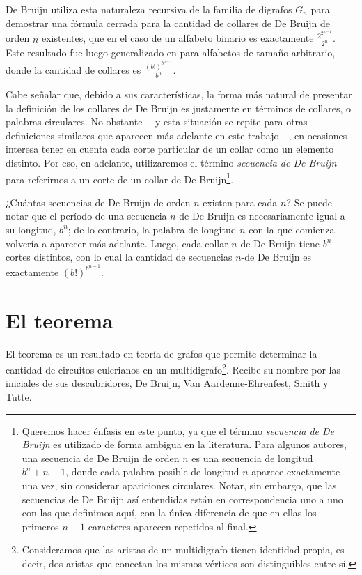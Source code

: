 De Bruijn utiliza esta naturaleza recursiva de la familia de digrafos $G_n$
para demostrar una fórmula cerrada para la cantidad de collares de De Bruijn
de orden $n$ existentes, que en el caso de un alfabeto binario es exactamente
$\frac{2^{2^{n-1}}}{2^n}$. Este resultado fue luego generalizado en
\cite{van-aardenne-ehrenfest-circuits-and-trees} para alfabetos de tamaño arbitrario,
donde la cantidad de collares es $\frac{(b!)^{b^{n-1}}}{b^n}$.

Cabe señalar que, debido a sus características, la forma más natural de
presentar la definición de los collares de De Bruijn es justamente en términos
de collares, o palabras circulares. No obstante ---y esta situación se repite
para otras definiciones similares que aparecen más adelante en este trabajo---,
en ocasiones interesa tener en cuenta cada corte particular de un collar como
un elemento distinto. Por eso, en adelante, utilizaremos el término
\emph{secuencia de De Bruijn} para referirnos a un corte de un collar de De
Bruijn\footnote{Queremos hacer énfasis en este punto, ya que el término
\emph{secuencia de De Bruijn} es utilizado de forma ambigua en la literatura.
Para algunos autores, una secuencia de De Bruijn de orden $n$ es una secuencia
de longitud $b^n + n - 1$, donde cada palabra posible de longitud $n$ aparece
exactamente una vez, sin considerar apariciones circulares. Notar, sin embargo,
que las secuencias de De Bruijn así entendidas están en correspondencia uno a
uno con las que definimos aquí, con la única diferencia de que en ellas los
primeros $n-1$ caracteres aparecen repetidos al final.}.

¿Cuántas secuencias de De Bruijn de orden $n$ existen para cada $n$? Se puede notar que
el período de una secuencia $n$-de De Bruijn es necesariamente igual a su
longitud, $b^n$; de lo contrario, la palabra de longitud $n$ con la que comienza
volvería a aparecer más adelante. Luego, cada collar $n$-de De Bruijn tiene
$b^n$ cortes distintos, con lo cual la cantidad de secuencias $n$-de De Bruijn
es exactamente $(b!)^{b^{n-1}}$.

\section{El teorema \BEST{}}

El teorema \BEST{} es un resultado en teoría de grafos que permite determinar la
cantidad de circuitos eulerianos en un multidigrafo\footnote{
	Consideramos que las aristas de un multidigrafo tienen identidad propia, es
	decir, dos aristas que conectan los mismos vértices son distinguibles entre
	sí.
}.
Recibe su nombre por las iniciales de sus descubridores,
De Bruijn, Van Aardenne-Ehrenfest, Smith y Tutte.


